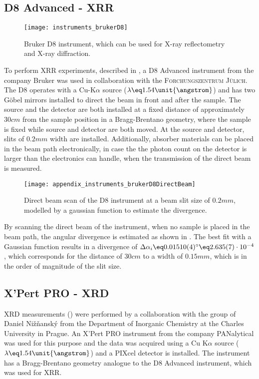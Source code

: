 \documentclass[\main/dresen_thesis.tex]{subfiles}
\begin{document}
  \subsection{D8 Advanced - XRR}
    \label{ch:instruments:laboratoryInstruments:xrr}
    \begin{figure}[ht]
      \centering
      \texttt{[image: instruments\_brukerD8]}
      \caption{\label{fig:appendix:instruments:brukerD8}Bruker D8 instrument, which can be used for X-ray reflectometry and X-ray diffraction.}
    \end{figure}
    To perform XRR experiments, described in , a D8 Advanced instrument from the company Bruker was used in collaboration with the \textsc{Forchungszentrum J\"ulich}.
    The D8 operates with a Cu-K$\alpha$ source ($\lambda \eq 1.54 \unit{\angstrom}$) and has two G\"obel mirrors installed to direct the beam in front and after the sample.
    The source and the detector are both installed at a fixed distance of approximately $30 \unit{cm}$ from the sample position in a Bragg-Brentano geometry, where the sample is fixed while source and detector are both moved.
    At the source and detector, slits of $0.2 \unit{mm}$ width are installed.
    Additionally, absorber materials can be placed in the beam path electronically, in case the the photon count on the detector is larger than the electronics can handle, \eg when the transmission of the direct beam is measured.

    \begin{figure}[ht]
      \centering
      \texttt{[image: appendix\_instruments\_brukerD8DirectBeam]}
      \caption{\label{fig:appendix:instruments:brukerD8DirectBeam}Direct beam scan of the D8 instrument at a beam slit size of $0.2 \unit{mm}$, modelled by a gaussian function to estimate the divergence.}
    \end{figure}

    By scanning the direct beam of the instrument, when no sample is placed in the beam path, the angular divergence is estimated as shown in .
    The best fit with a Gaussian function results in a divergence of $\Delta \alpha_i \eq 0.01510(4) ^\circ \eq 2.635(7) \cdot 10^{-4}$, which corresponds for the distance of $30 \unit{cm}$ to a width of $0.15 \unit{mm}$, which is in the order of magnitude of the slit size.


  \subsection{X'Pert PRO - XRD}
    \label{ch:instruments:laboratoryInstruments:xrd}
    XRD measurements () were performed by a collaboration with the group of Daniel Nižňanský from the Department of Inorganic Chemistry at the Charles University in Prague.
    An X'Pert PRO instrument from the company PANalytical was used for this purpose and the data was acquired using a Cu K$\alpha$ source ($\lambda \eq 1.54 \unit{\angstrom}$) and a PIXcel detector is installed.
    The instrument has a Bragg-Brentano geometry analogue to the D8 Advanced instrument, which was used for XRR.
\end{document}
